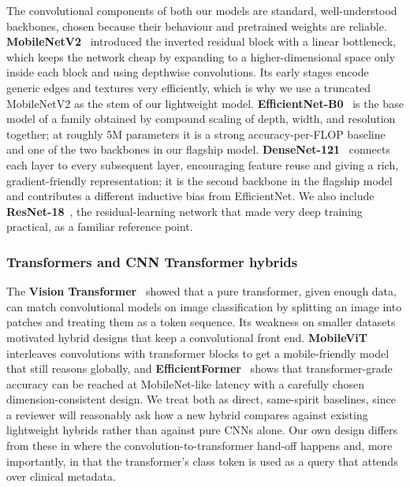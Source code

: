 The convolutional components of both our models are standard, well-understood
backbones, chosen because their behaviour and pretrained weights are reliable.
\textbf{MobileNetV2}~\cite{sandler2018mobilenetv2} introduced the inverted
residual block with a linear bottleneck, which keeps the network cheap by
expanding to a higher-dimensional space only inside each block and using
depthwise convolutions. Its early stages encode generic edges and textures very
efficiently, which is why we use a truncated MobileNetV2 as the stem of our
lightweight model. \textbf{EfficientNet-B0}~\cite{tan2019efficientnet} is the
base model of a family obtained by compound scaling of depth, width, and
resolution together; at roughly 5M parameters it is a strong accuracy-per-FLOP
baseline and one of the two backbones in our flagship model.
\textbf{DenseNet-121}~\cite{huang2017densenet} connects each layer to every
subsequent layer, encouraging feature reuse and giving a rich, gradient-friendly
representation; it is the second backbone in the flagship model and contributes a
different inductive bias from EfficientNet. We also include
\textbf{ResNet-18}~\cite{he2016resnet}, the residual-learning network that made
very deep training practical, as a familiar reference point.

\subsubsection{Transformers and CNN Transformer hybrids}

The \textbf{Vision Transformer}~\cite{dosovitskiy2021vit} showed that a pure
transformer, given enough data, can match convolutional models on image
classification by splitting an image into patches and treating them as a token
sequence. Its weakness on smaller datasets motivated hybrid designs that keep a
convolutional front end. \textbf{MobileViT}~\cite{mehta2022mobilevit} interleaves
convolutions with transformer blocks to get a mobile-friendly model that still
reasons globally, and \textbf{EfficientFormer}~\cite{li2022efficientformer} shows
that transformer-grade accuracy can be reached at MobileNet-like latency with a
carefully chosen dimension-consistent design. We treat both as direct,
same-spirit baselines, since a reviewer will reasonably ask how a new hybrid
compares against existing lightweight hybrids rather than against pure CNNs
alone. Our own design differs from these in where the convolution-to-transformer
hand-off happens and, more importantly, in that the transformer's class token is
used as a query that attends over clinical metadata.

